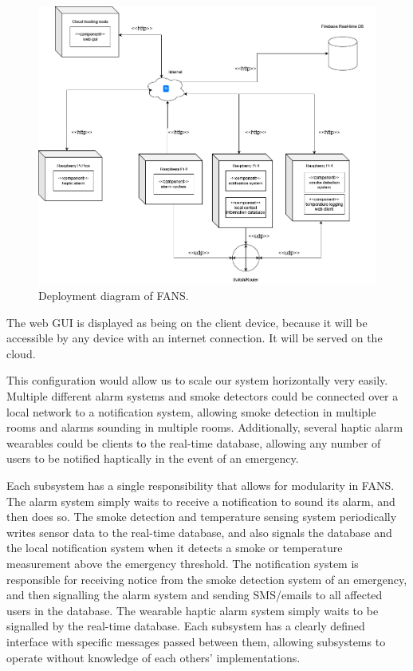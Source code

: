 \begin{figure}[H]
    \centering
    \includegraphics[width=\linewidth]{../assets/FANSDeployment.png}
    \caption{Deployment diagram of FANS.}
    \label{fig:deployment}
\end{figure}

The web GUI is displayed as being on the client device, because it will be accessible by any device with an internet
connection. It will be served on the cloud.

This configuration would allow us to scale our system horizontally very easily. Multiple different alarm systems and
smoke detectors could be connected over a local network to a notification system, allowing smoke detection in multiple
rooms and alarms sounding in multiple rooms. Additionally, several haptic alarm wearables could be clients to the
real-time database, allowing any number of users to be notified haptically in the event of an emergency.

Each subsystem has a single responsibility that allows for modularity in FANS. The alarm system simply waits to receive
a notification to sound its alarm, and then does so. The smoke detection and temperature sensing system periodically
writes sensor data to the real-time database, and also signals the database and the local notification system when it
detects a smoke or temperature measurement above the emergency threshold. The notification system is responsible for
receiving notice from the smoke detection system of an emergency, and then signalling the alarm system and sending
SMS/emails to all affected users in the database. The wearable haptic alarm system simply waits to be signalled by the
real-time database. Each subsystem has a clearly defined interface with specific messages passed between them, allowing
subsystems to operate without knowledge of each others’ implementations.

